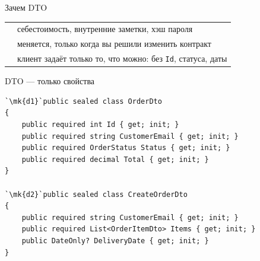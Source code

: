 \documentclass[aspectratio=169,10pt,t]{beamer}
\newcommand{\codexs}{\ttfamily\fontsize{7.0}{8.3}\selectfont}
\newcommand{\mk}[1]{\tikz[remember picture,overlay]\coordinate (#1) at (0,0.55ex);}
\begin{document}
\begin{frame}[plain]
\end{frame}

\begin{frame}{Зачем DTO}
  \slidetop

  {\renewcommand{\arraystretch}{1.6}
  \begin{tabular}{@{}L{4.6cm}L{8.2cm}@{}}
           & себестоимость, внутренние заметки, хэш
      пароля \\
     & меняется, только когда вы решили изменить
      контракт \\
      & клиент задаёт только то, что можно: без
      \texttt{Id}, статуса, даты \\
  \end{tabular}}

  \slidegap
\end{frame}

\begin{frame}[fragile]{DTO --- только свойства}
  \slidetop

\begin{lstlisting}[style=csharp,basicstyle=\codexs,escapechar=`]
`\mk{d1}`public sealed class OrderDto
{
    public required int Id { get; init; }
    public required string CustomerEmail { get; init; }
    public required OrderStatus Status { get; init; }
    public required decimal Total { get; init; }
}

`\mk{d2}`public sealed class CreateOrderDto
{
    public required string CustomerEmail { get; init; }
    public required List<OrderItemDto> Items { get; init; }
    public DateOnly? DeliveryDate { get; init; }
}
\end{lstlisting}

  \slidegap
\end{frame}
\end{document}
